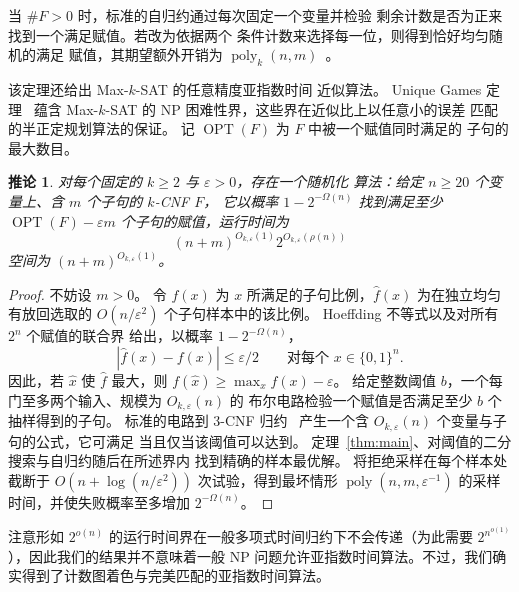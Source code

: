 \documentclass[11pt,reqno]{amsart}
\numberwithin{equation}{section}
\newtheorem{corollary}[theorem]{推论}
\theoremstyle{definition}\newtheorem{definition}[theorem]{定义}
\theoremstyle{remark}\newtheorem{remark}[theorem]{注}
\newcommand{\poly}{\operatorname{poly}}
\renewcommand{\le}{\leqslant}
\renewcommand{\ge}{\geqslant}
\begin{document}
当 $\#F>0$ 时，标准的自归约通过每次固定一个变量并检验
剩余计数是否为正来找到一个满足赋值。若改为依据两个
条件计数来选择每一位，则得到恰好均匀随机的满足
赋值，其期望额外开销为 $\poly_k(n,m)$~\cite[定理~3.3(1)]{JVV86}。

该定理还给出 Max-$k$-SAT 的任意精度亚指数时间
近似算法。
Unique Games 定理~\cite[第~8.1 节]{OpenAIUGC26} 蕴含
Max-$k$-SAT 的 NP 困难性界，这些界在近似比上以任意小的误差
匹配~\cite{Rag08} 的半正定规划算法的保证。
记 $\operatorname{OPT}(F)$ 为 $F$ 中被一个赋值同时满足的
子句的最大数目。
\begin{corollary}\label{cor:max-sat-approximation}
对每个固定的 $k\ge2$ 与 $\varepsilon>0$，存在一个随机化
算法：给定 $n\ge20$ 个变量上、含 $m$ 个子句的 $k$-CNF $F$，
它以概率 $1-2^{-\Omega(n)}$ 找到满足至少
$\operatorname{OPT}(F)-\varepsilon m$ 个子句的赋值，运行时间为
\[
 (n+m)^{O_{k,\varepsilon}(1)}2^{O_{k,\varepsilon}(\rho(n))}
\]
空间为 $(n+m)^{O_{k,\varepsilon}(1)}$。
\end{corollary}
\begin{proof}
不妨设 $m>0$。
令 $f(x)$ 为 $x$ 所满足的子句比例，$\widehat f(x)$ 为在独立均匀
有放回选取的 $O(n/\varepsilon^2)$ 个子句样本中的该比例。
Hoeffding 不等式以及对所有 $2^n$ 个赋值的联合界
给出，以概率 $1-2^{-\Omega(n)}$，
\[
 |\widehat f(x)-f(x)|\le\varepsilon/2
 \qquad\text{对每个 }x\in\{0,1\}^n.
\]
因此，若 $\widehat x$ 使 $\widehat f$ 最大，则
$f(\widehat x)\ge\max_x f(x)-\varepsilon$。
给定整数阈值 $b$，一个每门至多两个输入、规模为 $O_{k,\varepsilon}(n)$ 的
布尔电路检验一个赋值是否满足至少 $b$ 个抽样得到的子句。
标准的电路到 $3$-CNF 归约~\cite[引理~15.9--15.10]{Bar23}
产生一个含 $O_{k,\varepsilon}(n)$ 个变量与子句的公式，它可满足
当且仅当该阈值可以达到。
定理~\ref{thm:main}、对阈值的二分搜索与自归约随后在所述界内
找到精确的样本最优解。
将拒绝采样在每个样本处截断于 $O(n+\log(n/\varepsilon^2))$
次试验，得到最坏情形 $\poly(n,m,\varepsilon^{-1})$
的采样时间，并使失败概率至多增加 $2^{-\Omega(n)}$。
\end{proof}

注意形如 $2^{o(n)}$ 的运行时间界在一般多项式时间归约下不会传递（为此需要 $2^{n^{o(1)}}$），因此我们的结果并不意味着一般 NP 问题允许亚指数时间算法。不过，我们确实得到了计数图着色与完美匹配的亚指数时间算法。
\end{document}
